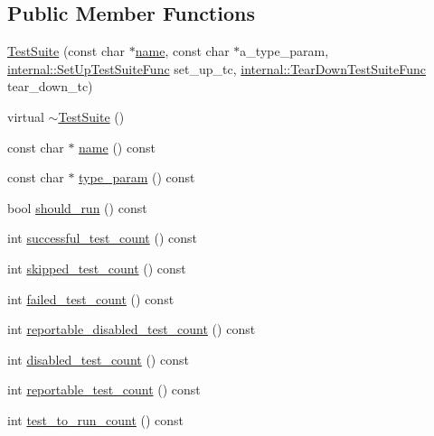 \subsection*{Public Member Functions}
\begin{DoxyCompactItemize}
\item 
\hyperlink{classtesting_1_1TestSuite_a2d6469bcb83701e1bbfe47c465e9731f}{Test\+Suite} (const char $\ast$\hyperlink{classtesting_1_1TestSuite_ab3369db678ca3d9648d6fd63ad038986}{name}, const char $\ast$a\+\_\+type\+\_\+param, \hyperlink{namespacetesting_1_1internal_a83e4e0732ac6a9dcfe6ee299dc1b9fa2}{internal\+::\+Set\+Up\+Test\+Suite\+Func} set\+\_\+up\+\_\+tc, \hyperlink{namespacetesting_1_1internal_a8257a87aa42cebaa54b0c48a6ae657a5}{internal\+::\+Tear\+Down\+Test\+Suite\+Func} tear\+\_\+down\+\_\+tc)
\item 
virtual \hyperlink{classtesting_1_1TestSuite_a78af2d96b44c8b8f2002b4e74df31c38}{$\sim$\+Test\+Suite} ()
\item 
const char $\ast$ \hyperlink{classtesting_1_1TestSuite_ab3369db678ca3d9648d6fd63ad038986}{name} () const
\item 
const char $\ast$ \hyperlink{classtesting_1_1TestSuite_ab2ea12318bdbfb6aa97792344b49e3db}{type\+\_\+param} () const
\item 
bool \hyperlink{classtesting_1_1TestSuite_a8f62c17baef80042e0ff03ef5d5e4ba7}{should\+\_\+run} () const
\item 
int \hyperlink{classtesting_1_1TestSuite_a85bc4191681df7e8bae810c1744465ec}{successful\+\_\+test\+\_\+count} () const
\item 
int \hyperlink{classtesting_1_1TestSuite_ae48c72ff92fa1c555e3b577f8661285c}{skipped\+\_\+test\+\_\+count} () const
\item 
int \hyperlink{classtesting_1_1TestSuite_aaf18223e67cf0761f56bd4b8167abc6c}{failed\+\_\+test\+\_\+count} () const
\item 
int \hyperlink{classtesting_1_1TestSuite_ab0b3d1ee8efaa18ceb2553a71002c678}{reportable\+\_\+disabled\+\_\+test\+\_\+count} () const
\item 
int \hyperlink{classtesting_1_1TestSuite_adba738351633471e3256dcf7d3c2e61e}{disabled\+\_\+test\+\_\+count} () const
\item 
int \hyperlink{classtesting_1_1TestSuite_a24f62e17cfd37b90263f1194fb7d4d74}{reportable\+\_\+test\+\_\+count} () const
\item 
int \hyperlink{classtesting_1_1TestSuite_a1ccf2681712a3a27659789009815db8f}{test\+\_\+to\+\_\+run\+\_\+count} () const
\item 

\end{DoxyCompactItemize}
